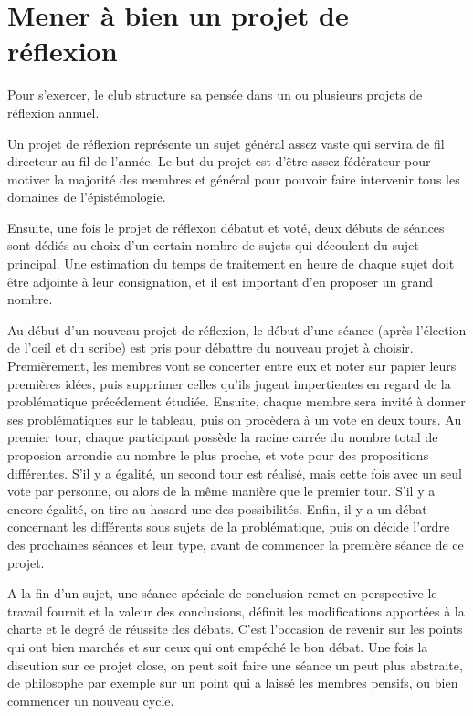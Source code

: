 \documentclass[a4paper,12pt]{article}
\begin{document}
\section{Mener à bien un projet de réflexion}
Pour s'exercer, le club structure sa pensée dans un ou plusieurs projets de réflexion annuel.

Un projet de réflexion représente un sujet général assez vaste qui servira de fil directeur au fil de l'année. Le but du projet est d'être assez fédérateur pour motiver la majorité des membres et général pour pouvoir faire intervenir tous les domaines de l'épistémologie.

Ensuite, une fois le projet de réflexon débatut et voté, deux débuts de séances sont dédiés au choix d'un certain nombre de sujets qui découlent du sujet principal. Une estimation du temps de traitement en heure de chaque sujet doit être adjointe à leur consignation, et il est important d'en proposer un grand nombre.

Au début d'un nouveau projet de réflexion, le début d'une séance (après l'élection de l'oeil et du scribe) est pris pour débattre du nouveau projet à choisir. Premièrement, les membres vont se concerter entre eux et noter sur papier leurs premières idées, puis supprimer celles qu'ils jugent impertientes en regard de la problématique précédement étudiée. Ensuite, chaque membre sera invité à donner ses problématiques sur le tableau, puis on procèdera à un vote en deux tours.
Au premier tour, chaque participant possède la racine carrée du nombre total de proposion arrondie au nombre le plus proche, et vote pour des propositions différentes. S'il y a égalité, un second tour est réalisé, mais cette fois avec un seul vote par personne, ou alors de la même manière que le premier tour. S'il y a encore égalité, on tire au hasard une des possibilités. 
Enfin, il y a un débat concernant les différents sous sujets de la problématique, puis on décide l'ordre des prochaines séances et leur type, avant de commencer la première séance de ce projet.

A la fin d'un sujet, une séance spéciale de conclusion remet en perspective le travail fournit et la valeur des conclusions, définit les modifications apportées à la charte et le degré de réussite des débats. C'est l'occasion de revenir sur les points qui ont bien marchés et sur ceux qui ont empéché le bon débat. Une fois la discution sur ce projet close, on peut soit faire une séance un peut plus abstraite, de philosophe par exemple sur un point qui a laissé les membres pensifs, ou bien commencer un nouveau cycle.
\end{document}
